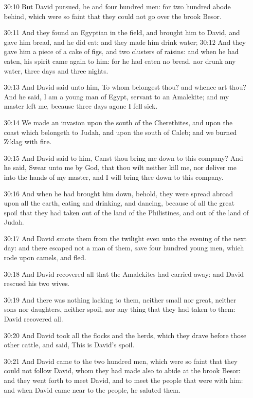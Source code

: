 30:10 But David pursued, he and four hundred men: for two hundred abode behind, which were so faint that they could not go over the brook Besor.

30:11 And they found an Egyptian in the field, and brought him to David, and gave him bread, and he did eat; and they made him drink water; 30:12 And they gave him a piece of a cake of figs, and two clusters of raisins: and when he had eaten, his spirit came again to him: for he had eaten no bread, nor drunk any water, three days and three nights.

30:13 And David said unto him, To whom belongest thou? and whence art thou? And he said, I am a young man of Egypt, servant to an Amalekite; and my master left me, because three days agone I fell sick.

30:14 We made an invasion upon the south of the Cherethites, and upon the coast which belongeth to Judah, and upon the south of Caleb; and we burned Ziklag with fire.

30:15 And David said to him, Canst thou bring me down to this company?  And he said, Swear unto me by God, that thou wilt neither kill me, nor deliver me into the hands of my master, and I will bring thee down to this company.

30:16 And when he had brought him down, behold, they were spread abroad upon all the earth, eating and drinking, and dancing, because of all the great spoil that they had taken out of the land of the Philistines, and out of the land of Judah.

30:17 And David smote them from the twilight even unto the evening of the next day: and there escaped not a man of them, save four hundred young men, which rode upon camels, and fled.

30:18 And David recovered all that the Amalekites had carried away: and David rescued his two wives.

30:19 And there was nothing lacking to them, neither small nor great, neither sons nor daughters, neither spoil, nor any thing that they had taken to them: David recovered all.

30:20 And David took all the flocks and the herds, which they drave before those other cattle, and said, This is David's spoil.

30:21 And David came to the two hundred men, which were so faint that they could not follow David, whom they had made also to abide at the brook Besor: and they went forth to meet David, and to meet the people that were with him: and when David came near to the people, he saluted them.

